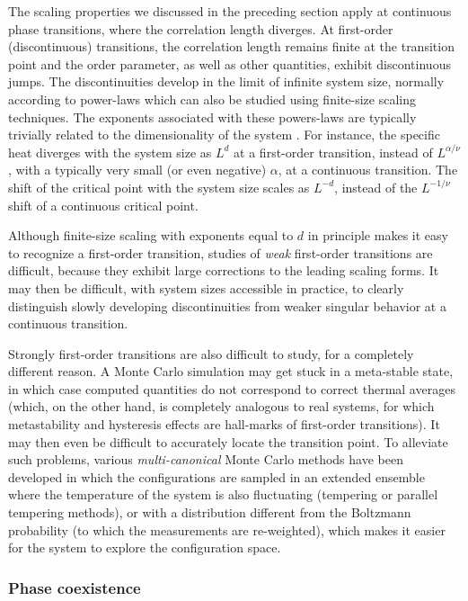 \documentclass[draft,numberedheadings]{aipproc}
\begin{document}
The scaling properties we discussed in the preceding section apply at continuous phase transitions, where the correlation length diverges.
At first-order (discontinuous) transitions, the correlation length remains finite at the transition point and the order parameter, as well as
other quantities, exhibit discontinuous jumps. The discontinuities  develop in the limit of infinite system size, normally according to power-laws 
which can also be studied using finite-size scaling techniques. The exponents associated with these powers-laws are typically trivially related to the 
dimensionality of the system \cite{fisher82,vollmayr91,lee91}. For instance, the specific heat diverges with the system size as $L^d$ at a first-order 
transition, instead of $L^{\alpha/\nu}$, with a typically very small (or even negative) $\alpha$, at a continuous transition. The shift of the critical 
point with the system size scales as $L^{-d}$, instead of the $L^{-1/\nu}$ shift of a continuous critical point.

Although finite-size scaling with exponents equal to $d$ in principle makes it easy to recognize a first-order transition, studies of {\it weak} first-order 
transitions are difficult, because they exhibit large corrections to the leading scaling forms. It may then be difficult, with system sizes accessible in
practice, to clearly distinguish slowly developing discontinuities from weaker singular behavior at a continuous transition. 

Strongly first-order transitions are also difficult to study, for a completely different reason. A Monte Carlo simulation may get stuck in a 
meta-stable state, in which case computed quantities do not correspond to correct thermal averages (which, on the other hand, is completely analogous
to real systems, for which metastability and hysteresis effects are hall-marks of first-order transitions). It may then even be difficult to accurately
locate the transition point. To alleviate such problems, various {\it multi-canonical} Monte Carlo methods have been developed in which the configurations 
are sampled in an extended ensemble where the temperature of the system is also fluctuating (tempering or parallel tempering \cite{marinari,hukushima}
methods), or with a distribution different from the Boltzmann probability \cite{berg,wanglandau,trebst} (to which the measurements are re-weighted), 
which makes it easier for the system to explore the configuration space. 

\subsubsection{Phase coexistence}
\end{document}
